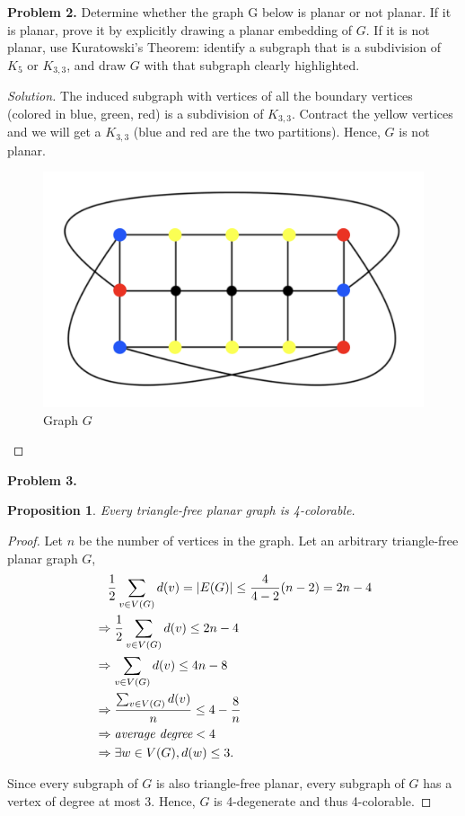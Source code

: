\documentclass{article}
\newtheorem{prop}[thm]{Proposition}
\begin{document}
\textbf{Problem 2.}
Determine whether the graph G below is planar or not planar. 
If it is planar, prove it by explicitly drawing a planar embedding of $G$. 
If it is not planar, use Kuratowski's Theorem: identify a subgraph that is a subdivision of $K_5$ or $K_{3,3}$, and draw $G$ with that subgraph clearly highlighted.
\begin{proof}[Solution]
    The induced subgraph with vertices of all the boundary vertices (colored in blue, green, red) is a subdivision of $K_{3,3}$.
    Contract the yellow vertices and we will get a $K_{3,3}$ (blue and red are the two partitions). Hence, $G$ is not planar.
    \begin{figure}[h]
        \centering
        \includegraphics[scale=0.3]{graph.png}
        \caption{Graph $G$}
    \end{figure}
\end{proof}
\bigbreak

\textbf{Problem 3.}
\begin{prop}
    Every triangle-free planar graph is 4-colorable.
\end{prop}
\begin{proof}
    Let $n$ be the number of vertices in the graph. Let an arbitrary triangle-free planar graph $G$,
    \begin{align*}
        & \quad\frac{1}{2}\sum_{v\in V(G)} d(v) = |E(G)| \le \frac{4}{4-2}(n - 2) = 2n - 4 \\ 
        & \Rightarrow \frac{1}{2}\sum_{v\in V(G)} d(v) \le 2n - 4 \\ 
        & \Rightarrow \sum_{v\in V(G)}d(v) \le 4n-8 \\ 
        & \Rightarrow \frac{\sum_{v\in V(G)}d(v)}{n} \le 4-\frac{8}{n} \\ 
        & \Rightarrow \emph{average degree} < 4 \\ 
        & \Rightarrow \exists w \in V(G), d(w) \le 3.
    \end{align*}

    Since every subgraph of $G$ is also triangle-free planar, every subgraph of $G$ has a vertex of degree at most 3.
    Hence, $G$ is 4-degenerate and thus 4-colorable.
\end{proof}
\end{document}
